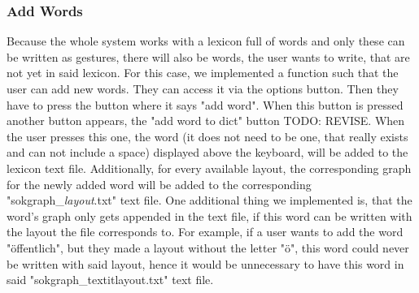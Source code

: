 \subsubsection{Add Words}
Because the whole system works with a lexicon full of words and only these can be written as gestures, there will also be words, the user wants to write, that are not yet in said lexicon. For this case, we implemented a function such that the user can add new words. They can access it via the options button. Then they have to press the button where it says "add word". When this button is pressed another button appears, the "add word to dict" button TODO: REVISE. When the user presses this one, the word (it does not need to be one, that really exists and can not include a space) displayed above the keyboard, will be added to the lexicon text file. Additionally, for every available layout, the corresponding graph for the newly added word will be added to the corresponding "sokgraph\_\textit{layout}.txt" text file. One additional thing we implemented is, that the word's graph only gets appended in the text file, if this word can be written with the layout the file corresponds to. For example, if a user wants to add the word "öffentlich", but they made a layout without the letter "ö", this word could never be written with said layout, hence it would be unnecessary to have this word in said "sokgraph\_textit{layout}.txt" text file.\\

